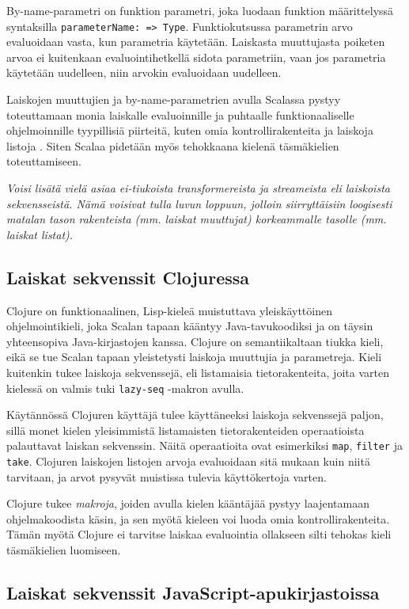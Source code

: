 By-name-parametri on funktion parametri, joka luodaan funktion määrittelyssä syntaksilla \verb!parameterName: => Type!. Funktiokutsussa parametrin arvo evaluoidaan vasta, kun parametria käytetään. Laiskasta muuttujasta poiketen arvoa ei kuitenkaan evaluointihetkellä sidota parametriin, vaan jos parametria käytetään uudelleen, niin arvokin evaluoidaan uudelleen.

Laiskojen muuttujien ja by-name-parametrien avulla Scalassa pystyy toteuttamaan monia laiskalle evaluoinnille ja puhtaalle funktionaaliselle ohjelmoinnille tyypillisiä piirteitä, kuten omia kontrollirakenteita ja laiskoja listoja \citet{chiusano2014functional}. Siten Scalaa pidetään myös tehokkaana kielenä täsmäkielien toteuttamiseen.

\textit{Voisi lisätä vielä asiaa ei-tiukoista transformereista ja streameista eli laiskoista sekvensseistä. Nämä voisivat tulla luvun loppuun, jolloin siirryttäisiin loogisesti matalan tason rakenteista (mm. laiskat muuttujat) korkeammalle tasolle (mm. laiskat listat).}

\subsection{Laiskat sekvenssit Clojuressa}

Clojure on funktionaalinen, Lisp-kieleä muistuttava yleiskäyttöinen ohjelmointikieli, joka Scalan tapaan kääntyy Java-tavukoodiksi ja on täysin yhteensopiva Java-kirjastojen kanssa. Clojure on semantiikaltaan tiukka kieli, eikä se tue Scalan tapaan yleistetysti laiskoja muuttujia ja parametreja. Kieli kuitenkin tukee laiskoja sekvenssejä, eli listamaisia tietorakenteita, joita varten kielessä on valmis tuki \verb!lazy-seq! -makron avulla.

Käytännössä Clojuren käyttäjä tulee käyttäneeksi laiskoja sekvenssejä paljon, sillä monet kielen yleisimmistä listamaisten tietorakenteiden operaatioista palauttavat laiskan sekvenssin. Näitä operaatioita ovat esimerkiksi \verb!map!, \verb!filter! ja \verb!take!. Clojuren laiskojen listojen arvoja evaluoidaan sitä mukaan kuin niitä tarvitaan, ja arvot pysyvät muistissa tulevia käyttökertoja varten.

Clojure tukee \textit{makroja}, joiden avulla kielen kääntäjää pystyy laajentamaan ohjelmakoodista käsin, ja sen myötä kieleen voi luoda omia kontrollirakenteita. Tämän myötä Clojure ei tarvitse laiskaa evaluointia ollakseen silti tehokas kieli täsmäkielien luomiseen.

\subsection{Laiskat sekvenssit JavaScript-apukirjastoissa}

